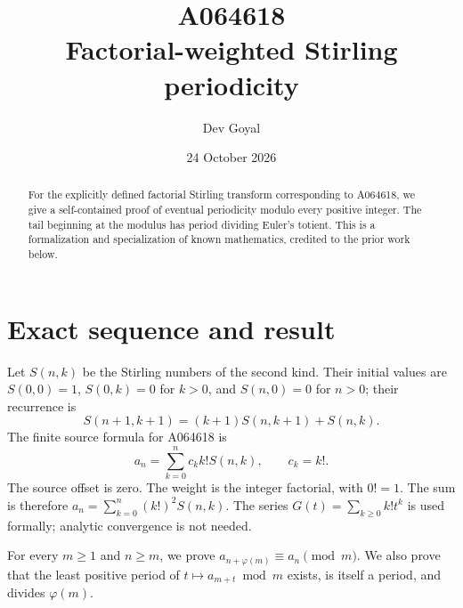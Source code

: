 \documentclass[11pt,a4paper]{article}
\title{A064618\\[3pt]Factorial-weighted Stirling periodicity}
\author{Dev Goyal}
\date{24 October 2026}
\theoremstyle{remark}
\begin{document}
\maketitle
\begin{center}
\end{center}
\begin{abstract}
For the explicitly defined factorial Stirling transform corresponding to A064618, we give a self-contained proof of eventual periodicity modulo every positive integer. The tail beginning at the modulus has period dividing Euler's totient. This is a formalization and specialization of known mathematics, credited to the prior work below.
\end{abstract}
\section{Exact sequence and result}
Let $S(n,k)$ be the Stirling numbers of the second kind. Their initial
values are $S(0,0)=1$, $S(0,k)=0$ for $k>0$, and $S(n,0)=0$ for
$n>0$; their recurrence is
\[
S(n+1,k+1)=(k+1)S(n,k+1)+S(n,k).
\]
The finite source formula for A064618 \cite{oeis} is
\[
a_n=\sum_{k=0}^n c_k k!S(n,k),\qquad c_k=k!.
\]
The source offset is zero. The weight is the integer factorial, with $0!=1$. The sum is therefore $a_n=\sum_{k=0}^n(k!)^2S(n,k)$. The series $G(t)=\sum_{k\ge0}k!t^k$ is used formally; analytic convergence is not needed.

For every $m\ge1$ and $n\ge m$, we prove
$a_{n+\varphi(m)}\equiv a_n\pmod m$. We also prove that the least
positive period of $t\mapsto a_{m+t}\bmod m$ exists, is itself a
period, and divides $\varphi(m)$.
\end{document}
